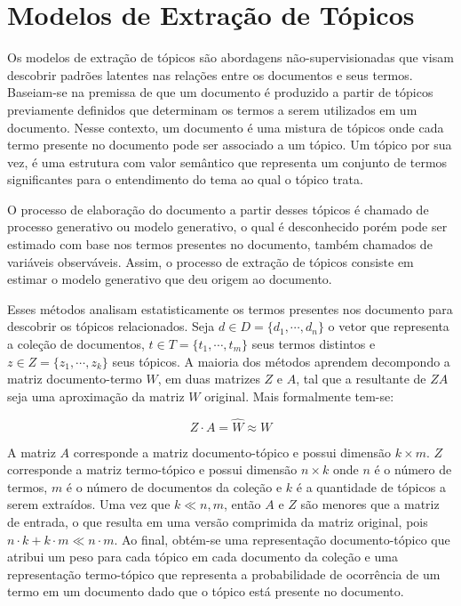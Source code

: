 \section{Modelos de Extração de Tópicos}



Os modelos de extração de tópicos são abordagens não-supervisionadas que visam descobrir padrões latentes nas relações entre os documentos e seus termos.  Baseiam-se na premissa de que um documento é produzido a partir de tópicos previamente definidos que determinam os termos a serem utilizados em um documento. Nesse contexto, um documento é uma mistura de tópicos onde cada termo presente no documento pode ser associado a um tópico. Um tópico por sua vez, é uma estrutura com valor semântico que representa um conjunto de termos significantes para o entendimento do tema ao qual o tópico trata. 



O processo de elaboração do documento a partir desses tópicos é chamado de processo generativo ou modelo generativo, o qual é desconhecido porém pode ser estimado com base nos termos presentes no documento, também chamados de variáveis observáveis. Assim, o processo de extração de tópicos consiste em estimar o modelo generativo que deu origem ao documento.







Esses métodos analisam estatisticamente os termos presentes nos documento para descobrir os tópicos relacionados. Seja 
$d \in D = \{d_1,\cdots,d_n\}$ o vetor que representa a coleção de documentos, 
$t \in T = \{t_1,\cdots,t_m\}$ seus termos distintos e 
$z \in Z = \{z_1,\cdots,z_k\}$ seus tópicos. 
A maioria dos métodos aprendem decompondo a matriz documento-termo $W$, em duas matrizes $Z$ e $A$, tal que a resultante de $ZA$ seja uma aproximação da matriz $W$ original. Mais formalmente tem-se:

\begin{equation}
	Z\cdot A = \hat{W} \approx W
\end{equation}

A matriz
$A$ corresponde a matriz documento-tópico e possui dimensão $k \times m$. $Z$ corresponde a matriz termo-tópico e possui dimensão $n \times k$ onde $n$ é o número de termos, $m$ é o número de documentos da coleção e $k$ é a quantidade de tópicos a serem extraídos.
Uma vez que $k \ll n,m$, então $A$ e $Z$ são menores que a matriz de entrada, o que resulta em uma versão comprimida da matriz original, pois $n \cdot k + k \cdot m \ll n \cdot m$.
% 
% 
Ao final, obtém-se uma representação documento-tópico que atribui um peso para cada tópico em cada documento da coleção e uma representação termo-tópico que representa a probabilidade de ocorrência de um termo em um documento dado que o tópico está presente no documento.

